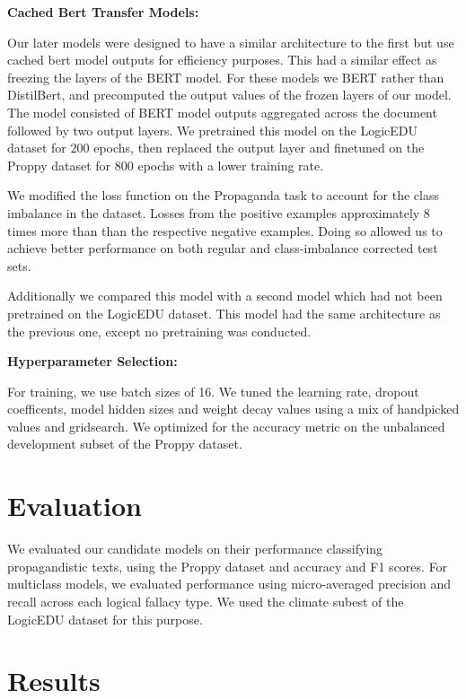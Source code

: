 \documentclass[conference]{IEEEtran}
\begin{document}
\textbf{Cached Bert Transfer Models:}
 
 Our later models were designed to have a similar architecture to the first but use cached bert model outputs for efficiency purposes. This had a similar effect as freezing the layers of the BERT model. For these models we BERT rather than DistilBert, and precomputed the output values of the frozen layers of our model. The model consisted of BERT model outputs aggregated across the document followed by two output layers. We pretrained this model on the LogicEDU  dataset for $200$ epochs, then replaced the output layer and finetuned on the Proppy dataset for $800$ epochs with a lower training rate. 
 
 We modified the loss function on the Propaganda task to account for the class imbalance in the dataset. Losses from the positive examples approximately 8 times more than than the respective negative examples. Doing so allowed us to achieve better performance on both regular and class-imbalance corrected test sets. 
 
 
 Additionally we compared this model with a second model which had not been pretrained on the LogicEDU dataset. This model had the same architecture as the previous one, except no pretraining was conducted. 

\textbf{Hyperparameter Selection:}

For training, we use batch sizes of 16. We tuned the learning rate, dropout coefficents, model hidden sizes and weight decay values using a mix of handpicked values and gridsearch. We optimized for the accuracy metric on the unbalanced development subset of the Proppy dataset. 

\section{Evaluation}
\label{sec:evaluation}
We evaluated our candidate models on their performance classifying propagandistic texts, using the Proppy dataset and accuracy and F1 scores. For multiclass models, we evaluated performance using micro-averaged precision and recall across each logical fallacy type. We used the climate subest of the LogicEDU dataset for this purpose.

\section{Results} 
\end{document}
